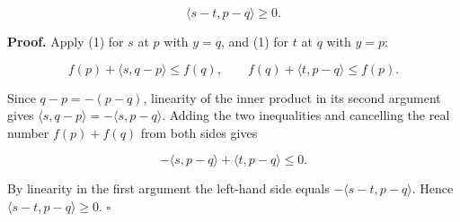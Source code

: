 \documentclass[11pt,a4paper]{report}
\begin{document}
\[\langle s-t,p-q\rangle\ge0.\]


\textbf{Proof.} Apply (1) for \(s\) at \(p\) with \(y=q\), and (1) for \(t\) at \(q\) with \(y=p\):


\[f(p)+\langle s,q-p\rangle\le f(q),\qquad f(q)+\langle t,p-q\rangle\le f(p).\]


Since \(q-p=-(p-q)\), linearity of the inner product in its second argument gives \(\langle s,q-p\rangle=-\langle s,p-q\rangle\). Adding the two inequalities and cancelling the real number \(f(p)+f(q)\) from both sides gives


\[-\langle s,p-q\rangle+\langle t,p-q\rangle\le0.\]


By linearity in the first argument the left-hand side equals \(-\langle s-t,p-q\rangle\). Hence \(\langle s-t,p-q\rangle\ge0\). \(\square\)
\end{document}
